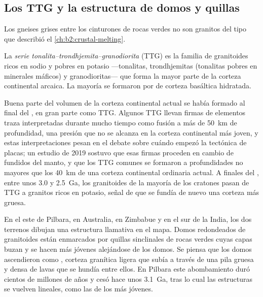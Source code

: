 \subsection*{Los TTG y la estructura de domos y quillas}

Los gneises grises entre los cinturones de rocas verdes no son granitos del tipo que
describió el \cref{ch:b2:crustal-melting}.

\begin{definition}\label{def:b2:precambrian-earth:ttg}
La \emph{serie tonalita--trondhjemita--granodiorita}
(TTG) es la familia de granitoides ricos en sodio y pobres en potasio ---tonalitas,
trondhjemitas (tonalitas pobres en minerales máficos) y granodioritas--- que forma la mayor parte de
la corteza continental arcaica. La mayoría se formaron por  de corteza basáltica
hidratada.
\end{definition}

Buena parte del volumen de la corteza continental actual se había formado al final del , en gran parte
como TTG. Algunos TTG llevan firmas de elementos traza interpretadas durante mucho tiempo como fusión a más de
\qty{50}{km} de profundidad, una presión que no se alcanza en la corteza continental más joven, y estas interpretaciones
pesan en el debate sobre cuándo empezó la tectónica de placas; un estudio de 2019 sostuvo que esas firmas
proceden en cambio de fundidos del manto, y que los TTG comunes se formaron a
profundidades no mayores que los \qty{40}{km} de una corteza continental ordinaria actual. A finales del
, entre unos 3.0 y \qty{2.5}{Ga}, los granitoides de la mayoría de los cratones pasan de TTG
a granitos ricos en potasio, señal de que se fundía de nuevo una corteza más gruesa.

En el este de Pilbara, en Australia, en Zimbabue y en el sur de la India, los dos terrenos dibujan una
estructura llamativa en el mapa. Domos redondeados de granitoides están enmarcados por quillas sinclinales de rocas verdes cuyas capas buzan y se hacen más jóvenes alejándose de los domos. Se
piensa que los domos ascendieron como , corteza granítica ligera que subía a través de una pila gruesa y densa de
lavas que se hundía entre ellos. En Pilbara este abombamiento duró cientos de millones de
años y cesó hace unos \qty{3.1}{Ga}, tras lo cual las estructuras se vuelven lineales, como las
de los  más jóvenes.

